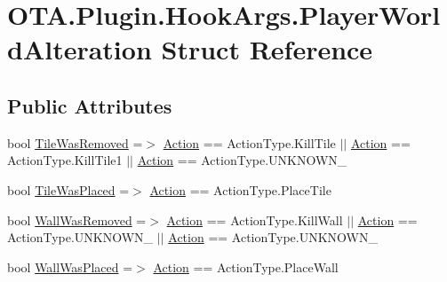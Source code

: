 \hypertarget{struct_o_t_a_1_1_plugin_1_1_hook_args_1_1_player_world_alteration}{}\section{O\+T\+A.\+Plugin.\+Hook\+Args.\+Player\+World\+Alteration Struct Reference}
\label{struct_o_t_a_1_1_plugin_1_1_hook_args_1_1_player_world_alteration}
\subsection*{Public Attributes}
\begin{DoxyCompactItemize}
\item 
bool \hyperlink{struct_o_t_a_1_1_plugin_1_1_hook_args_1_1_player_world_alteration_a1ff9350f4ec6c8f31e94fd706effe159}{Tile\+Was\+Removed} =$>$ \hyperlink{struct_o_t_a_1_1_plugin_1_1_hook_args_1_1_player_world_alteration_ab673355ec0d420e5b106f21693f7b870}{Action} == Action\+Type.\+Kill\+Tile $\vert$$\vert$ \hyperlink{struct_o_t_a_1_1_plugin_1_1_hook_args_1_1_player_world_alteration_ab673355ec0d420e5b106f21693f7b870}{Action} == Action\+Type.\+Kill\+Tile1 $\vert$$\vert$ \hyperlink{struct_o_t_a_1_1_plugin_1_1_hook_args_1_1_player_world_alteration_ab673355ec0d420e5b106f21693f7b870}{Action} == Action\+Type.\+U\+N\+K\+N\+O\+W\+N\+\_
\item 
bool \hyperlink{struct_o_t_a_1_1_plugin_1_1_hook_args_1_1_player_world_alteration_a419d6f4d87d99c773ff5e50785de58e9}{Tile\+Was\+Placed} =$>$ \hyperlink{struct_o_t_a_1_1_plugin_1_1_hook_args_1_1_player_world_alteration_ab673355ec0d420e5b106f21693f7b870}{Action} == Action\+Type.\+Place\+Tile
\item 
bool \hyperlink{struct_o_t_a_1_1_plugin_1_1_hook_args_1_1_player_world_alteration_aeeb703233d1fc2dffb7c9840b6aa3d73}{Wall\+Was\+Removed} =$>$ \hyperlink{struct_o_t_a_1_1_plugin_1_1_hook_args_1_1_player_world_alteration_ab673355ec0d420e5b106f21693f7b870}{Action} == Action\+Type.\+Kill\+Wall $\vert$$\vert$ \hyperlink{struct_o_t_a_1_1_plugin_1_1_hook_args_1_1_player_world_alteration_ab673355ec0d420e5b106f21693f7b870}{Action} == Action\+Type.\+U\+N\+K\+N\+O\+W\+N\+\_ $\vert$$\vert$ \hyperlink{struct_o_t_a_1_1_plugin_1_1_hook_args_1_1_player_world_alteration_ab673355ec0d420e5b106f21693f7b870}{Action} == Action\+Type.\+U\+N\+K\+N\+O\+W\+N\+\_
\item 
bool \hyperlink{struct_o_t_a_1_1_plugin_1_1_hook_args_1_1_player_world_alteration_a2eef65c8ae9561493698f7c4395cc508}{Wall\+Was\+Placed} =$>$ \hyperlink{struct_o_t_a_1_1_plugin_1_1_hook_args_1_1_player_world_alteration_ab673355ec0d420e5b106f21693f7b870}{Action} == Action\+Type.\+Place\+Wall
\end{DoxyCompactItemize}
